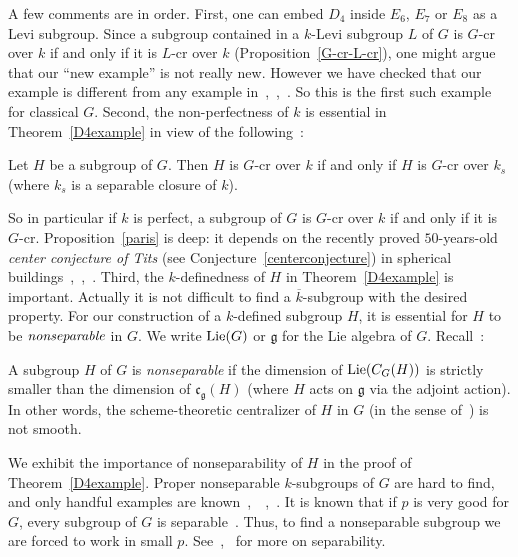 A few comments are in order. First, one can embed $D_4$ inside $E_6$, $E_7$ or $E_8$ as a Levi subgroup. Since a subgroup contained in a $k$-Levi subgroup $L$ of $G$ is $G$-cr over $k$ if and only if it is $L$-cr over $k$ (Proposition~\ref{G-cr-L-cr}), one might argue that our ``new example'' is not really new. However we have checked that our example is different from any example in~\cite[Thm.~1.10]{Uchiyama-Separability-JAlgebra},~\cite[Thm.~1.8]{Uchiyama-Classification-pre},~\cite[Thm.~1.2]{Uchiyama-Nonperfect-pre}. So this is the first such example for classical $G$. Second, the non-perfectness of $k$ is essential in Theorem~\ref{D4example} in view of the following~\cite[Thm.~1.1]{Bate-separable-Paris}:
\begin{prop}\label{paris}
Let $H$ be a subgroup of $G$. Then $H$ is $G$-cr over $k$ if and only if $H$ is $G$-cr over $k_s$ (where $k_s$ is a separable closure of $k$). 
\end{prop}
So in particular if $k$ is perfect, a subgroup of $G$ is $G$-cr over $k$ if and only if it is $G$-cr. Proposition~\ref{paris} is deep: it depends on the recently proved $50$-years-old \emph{center conjecture of Tits} (see Conjecture~\ref{centerconjecture}) in spherical buildings~\cite{Serre-building},~\cite{Tits-colloq},~\cite{Weiss-center-Fourier}. Third, the $k$-definedness of $H$ in Theorem~\ref{D4example} is important. 
Actually it is not difficult to find a $\overline k$-subgroup with the desired property. For our construction of a $k$-defined subgroup $H$, it is essential for $H$ to be $\emph{nonseparable}$ in $G$. We write $\textup{Lie}(G)$ or $\mathfrak g$ for the Lie algebra of $G$. Recall~\cite[Def.~1.1]{Bate-separability-TransAMS}:
\begin{defn}
A subgroup $H$ of $G$ is \emph{nonseparable} if the dimension of $\textup{Lie}(C_G(H))$ is strictly smaller than the dimension of $\mathfrak{c}_{\mathfrak{g}}(H)$ (where $H$ acts on $\mathfrak g$ via the adjoint action). In other words, the scheme-theoretic centralizer of $H$ in $G$ (in the sense of~\cite[Def.~A.1.9]{Conrad-pred-book}) is not smooth. 
\end{defn} 
We exhibit the importance of nonseparability of $H$ in the proof of Theorem~\ref{D4example}. Proper nonseparable $k$-subgroups of $G$ are hard to find, and only handful examples are known~\cite[Sec.~7]{Bate-separability-TransAMS},~\cite[Thm.~1.10]{Uchiyama-Separability-JAlgebra}~\cite[Thm.~1.8]{Uchiyama-Classification-pre},~\cite[Thm.~1.2]{Uchiyama-Nonperfect-pre}. It is known that if $p$ is very good for $G$, every subgroup of $G$ is separable~\cite[Thm.~1.2]{Bate-separability-TransAMS}. Thus, to find a nonseparable subgroup we are forced to work in small $p$. See~\cite{Bate-separability-TransAMS},~\cite{Herpel-smoothcentralizerl-trans} for more on separability. 

